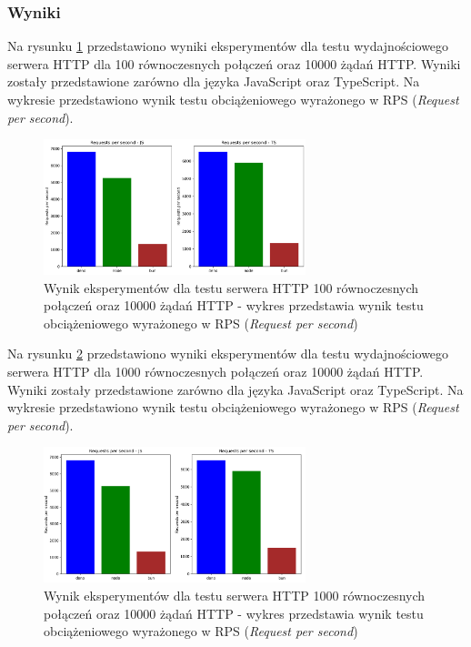 \subsubsection{Wyniki}
Na rysunku \ref{fig:server_e1} przedstawiono wyniki eksperymentów dla testu wydajnościowego serwera HTTP dla 100 równoczesnych połączeń oraz 10000 żądań HTTP. Wyniki zostały przedstawione zarówno dla języka JavaScript oraz TypeScript. Na wykresie przedstawiono wynik testu obciążeniowego wyrażonego w RPS (\textit{Request per second}).

\begin{figure}[H]
  \centering
  \includegraphics[width=0.68\textwidth]{Figures/server/server_100_10000.png}
  \caption{Wynik eksperymentów dla testu serwera HTTP 100 równoczesnych połączeń oraz 10000 żądań HTTP - wykres przedstawia wynik testu obciążeniowego wyrażonego w RPS (\textit{Request per second})}
  \label{fig:server_e1}
\end{figure}

Na rysunku \ref{fig:server_e2} przedstawiono wyniki eksperymentów dla testu wydajnościowego serwera HTTP dla 1000 równoczesnych połączeń oraz 10000 żądań HTTP. Wyniki zostały przedstawione zarówno dla języka JavaScript oraz TypeScript. Na wykresie przedstawiono wynik testu obciążeniowego wyrażonego w RPS (\textit{Request per second}).

\begin{figure}[H]
  \centering
  \includegraphics[width=0.68\textwidth]{Figures/server/server_1000_10000.png}
  \caption{Wynik eksperymentów dla testu serwera HTTP 1000 równoczesnych połączeń oraz 10000 żądań HTTP - wykres przedstawia wynik testu obciążeniowego wyrażonego w RPS (\textit{Request per second})}
  \label{fig:server_e2}
\end{figure}

